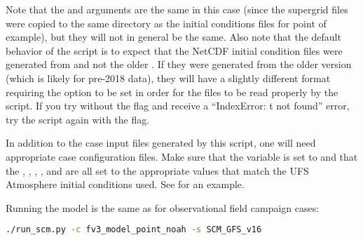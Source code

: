 Note that the  and  arguments are the same in this case (since the supergrid files were copied to the same directory as the initial conditions files for point of example), but they will not in general be the same. Also note that the default behavior of the script is to expect that the NetCDF initial condition files were generated from  and not the older . If they were generated from the older version (which is likely for pre-2018 data), they will have a slightly different format requiring the  option to be set in order for the files to be read properly by the script. If you try without the  flag and receive a ``IndexError: t not found'' error, try the script again with the flag.

In addition to the case input files generated by this script, one will need appropriate case configuration files. Make sure that the  variable is set to  and that the , , , , and  are all set to the appropriate values that match the UFS Atmosphere initial conditions used. See  for an example.

Running the model is the same as for observational field campaign cases:
\begin{lstlisting}[language=bash]
./run_scm.py -c fv3_model_point_noah -s SCM_GFS_v16
\end{lstlisting}
